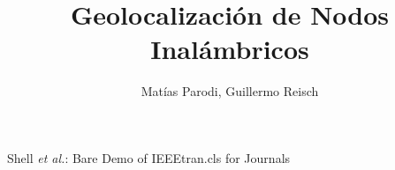 \documentclass[journal]{IEEEtran}
\begin{document}
%
\title{Geolocalización de Nodos Inalámbricos}
%
%
%

\author{Matías Parodi, Guillermo Reisch}

% 
%



%
{Shell \MakeLowercase{\textit{et al.}}: Bare Demo of IEEEtran.cls for Journals}
% 




\end{document}

